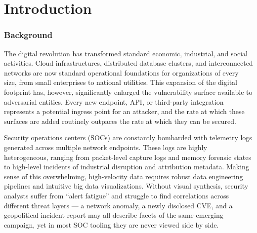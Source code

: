 \documentclass[a4paper, 12pt]{report}
\begin{document}
\newpage
\tableofcontents
\newpage

\chapter{Introduction}

\subsection{Background}
The digital revolution has transformed standard economic, industrial, and social activities. Cloud infrastructures, distributed database clusters, and interconnected networks are now standard operational foundations for organizations of every size, from small enterprises to national utilities. This expansion of the digital footprint has, however, significantly enlarged the vulnerability surface available to adversarial entities. Every new endpoint, API, or third-party integration represents a potential ingress point for an attacker, and the rate at which these surfaces are added routinely outpaces the rate at which they can be secured.

Security operations centers (SOCs) are constantly bombarded with telemetry logs generated across multiple network endpoints. These logs are highly heterogeneous, ranging from packet-level capture logs and memory forensic states to high-level incidents of industrial disruption and attribution metadata. Making sense of this overwhelming, high-velocity data requires robust data engineering pipelines and intuitive big data visualizations. Without visual synthesis, security analysts suffer from ``alert fatigue'' and struggle to find correlations across different threat layers --- a network anomaly, a newly disclosed CVE, and a geopolitical incident report may all describe facets of the same emerging campaign, yet in most SOC tooling they are never viewed side by side.
\end{document}
